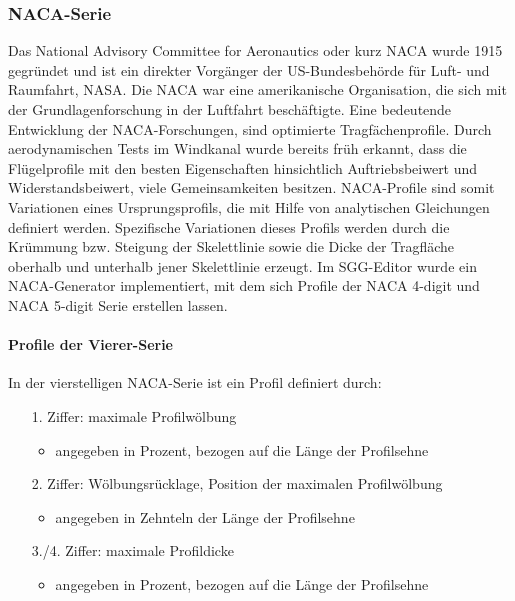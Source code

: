 \subsubsection{NACA-Serie}
Das National Advisory Committee for Aeronautics oder kurz NACA wurde 1915 gegründet und ist ein direkter Vorg\"anger der US-Bundesbehörde für Luft- und Raumfahrt, NASA. Die NACA war eine amerikanische Organisation, die sich mit der Grundlagenforschung in der Luftfahrt beschäftigte. Eine bedeutende Entwicklung der NACA-Forschungen, sind optimierte Tragf\"achenprofile. Durch aerodynamischen Tests im Windkanal wurde bereits fr\"uh erkannt, dass die Fl\"ugelprofile mit den besten Eigenschaften hinsichtlich Auftriebsbeiwert und Widerstandsbeiwert, viele Gemeinsamkeiten besitzen. NACA-Profile sind somit Variationen eines Ursprungsprofils, die mit Hilfe von analytischen Gleichungen definiert werden. Spezifische Variationen dieses Profils werden durch die Kr\"ummung bzw. Steigung der Skelettlinie sowie die Dicke der Tragfl\"ache oberhalb und unterhalb jener Skelettlinie erzeugt. Im SGG-Editor wurde ein NACA-Generator implementiert, mit dem sich Profile der NACA 4-digit und NACA 5-digit Serie erstellen lassen.

\paragraph{Profile der Vierer-Serie}

In der vierstelligen NACA-Serie ist ein Profil definiert durch:
\begin{itemize}
\item[1.]Ziffer: maximale Profilw\"olbung 
	\begin{itemize}
		\item angegeben in Prozent, bezogen auf die L\"ange der Profilsehne
	\end{itemize}
\item[2.]Ziffer: W\"olbungsrücklage, Position der maximalen Profilw\"olbung
	\begin{itemize}
		\item angegeben in Zehnteln der L\"ange der Profilsehne
	\end{itemize}
\item[3./4.]Ziffer: maximale Profildicke
	\begin{itemize}
		\item angegeben in Prozent, bezogen auf die L\"ange der Profilsehne
	\end{itemize}
\end{itemize} 


